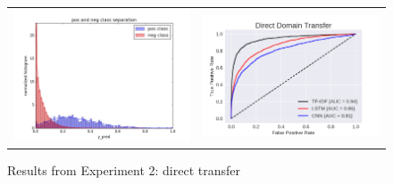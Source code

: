 \documentclass{sigkddExp}
\begin{document}
\begin{figure}[h]
\begin{tabular}{cc}
    \includegraphics[width=\columnwidth]{img/report_domain_transfer_tfidf_hist.png}
&   \includegraphics[width=\columnwidth]{img/report_da_roc_direct.png}
\end{tabular}
\label{fig:exp2a}
\caption{Results from Experiment 2: direct transfer}
\end{figure}
\end{document}

